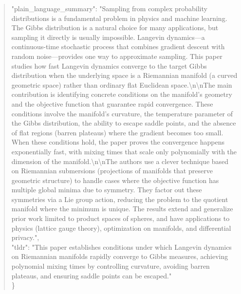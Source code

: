 \documentclass[11pt]{article}
\begin{document}
\begin{quote}
  "plain\_language\_summary": "Sampling from complex probability distributions is a fundamental problem in physics and machine learning. The Gibbs distribution is a natural choice for many applications, but sampling it directly is usually impossible. Langevin dynamics---a continuous-time stochastic process that combines gradient descent with random noise---provides one way to approximate sampling. This paper studies how fast Langevin dynamics converge to the target Gibbs distribution when the underlying space is a Riemannian manifold (a curved geometric space) rather than ordinary flat Euclidean space.\textbackslash{}n\textbackslash{}nThe main contribution is identifying concrete conditions on the manifold's geometry and the objective function that guarantee rapid convergence. These conditions involve the manifold's curvature, the temperature parameter of the Gibbs distribution, the ability to escape saddle points, and the absence of flat regions (barren plateaus) where the gradient becomes too small. When these conditions hold, the paper proves the convergence happens exponentially fast, with mixing times that scale only polynomially with the dimension of the manifold.\textbackslash{}n\textbackslash{}nThe authors use a clever technique based on Riemannian submersions (projections of manifolds that preserve geometric structure) to handle cases where the objective function has multiple global minima due to symmetry. They factor out these symmetries via a Lie group action, reducing the problem to the quotient manifold where the minimum is unique. The results extend and generalize prior work limited to product spaces of spheres, and have applications to physics (lattice gauge theory), optimization on manifolds, and differential privacy.",\\
  "tldr": "This paper establishes conditions under which Langevin dynamics on Riemannian manifolds rapidly converge to Gibbs measures, achieving polynomial mixing times by controlling curvature, avoiding barren plateaus, and ensuring saddle points can be escaped."\\
\}\\
\end{quote}
\end{document}
